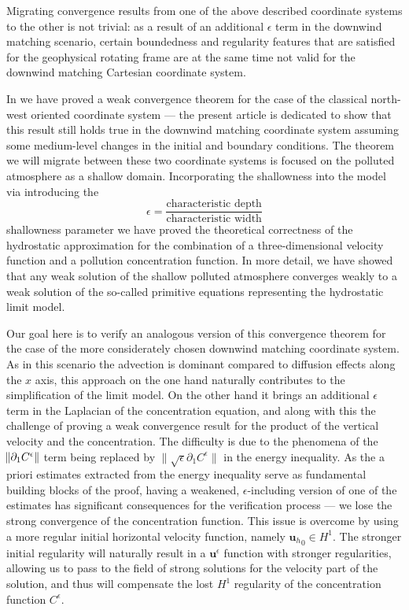 \documentclass[11pt]{article}
\begin{document}
Migrating convergence results from one of the above described coordinate systems to the other is not trivial: as a result of an additional $\epsilon$ term in the downwind matching scenario, certain boundedness and regularity features that are satisfied for the geophysical rotating frame are at the same time not valid for the downwind matching Cartesian coordinate system.

In \cite{pollatmws2019} we have proved a weak convergence theorem for the case of the classical north-west oriented coordinate system --- the present article is dedicated to show that this result still holds true in the downwind matching coordinate system assuming some medium-level changes in the initial and boundary conditions. The theorem we will migrate between these two coordinate systems is focused on the polluted atmosphere as a shallow domain. Incorporating the shallowness into the model via introducing the $$\epsilon = \frac{\text{characteristic depth}}{\text{characteristic width}}$$ shallowness parameter we have proved the theoretical correctness of the hydrostatic approximation for the combination of a three-dimensional velocity function and a pollution concentration function. In more detail, we have showed that any weak solution of the shallow polluted atmosphere converges weakly to a weak solution of the so-called primitive equations representing the hydrostatic limit model.

Our goal here is to verify an analogous version of this convergence theorem for the case of the more considerately chosen downwind matching coordinate system. As in this scenario the advection is dominant compared to diffusion effects along the $x$ axis, this approach on the one hand naturally contributes to the simplification of the limit model. On the other hand it brings an additional $\epsilon$ term in the Laplacian of the concentration equation, and along with this the challenge of proving a weak convergence result for the product of the vertical velocity and the concentration. The difficulty is due to the phenomena of the $\norm{\partial_1 C^\epsilon}$ term being replaced by $\| \sqrt{\epsilon} \partial_1 C^\epsilon \|$ in the energy inequality. As the a priori estimates extracted from the energy inequality serve as fundamental building blocks of the proof, having a weakened, $\epsilon$-including version of one of the estimates has significant consequences for the verification process --- we lose the strong convergence of the concentration function.  This issue is overcome by using a more regular initial horizontal velocity function, namely ${\mathbf{u}_h}_0 \in H^1.$ The stronger initial regularity will naturally result in a $\mathbf{u}^\epsilon$ function with stronger regularities, allowing us to pass to the field of strong solutions for the velocity part of the solution, and thus will compensate the lost $H^1$ regularity of the concentration function $C^\epsilon.$
\end{document}
